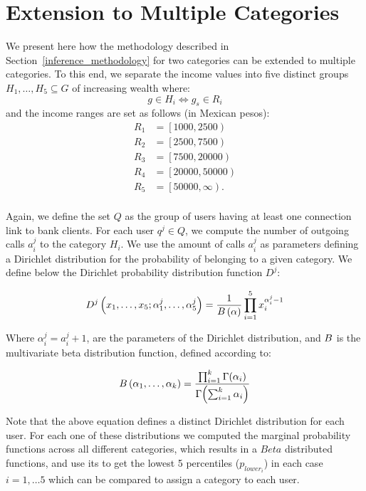 \section{Extension to Multiple Categories}

We present here how the methodology described in Section~\ref{inference_methodology} for
two categories can be extended to multiple categories.
To this end, we separate the income values into five distinct groups $ H_1, \ldots, H_5 \subseteq G$ of increasing wealth where:
\[
	g \in H_i \iff g_s \in R_i
\]
and the income ranges are set as follows (in Mexican pesos):
\begin{align*}
	R_1 &= \left[1000, 2500\right) \\
	R_2 &= \left[2500, 7500\right) \\
	R_3 &= \left[7500, 20000\right) \\
	R_4 &= \left[20000, 50000\right) \\
	R_5 &= \left[50000, \infty\right). \\
\end{align*}

Again, we define the set $Q$ as the group of users having at least one connection link to bank clients. For each user $q^j \in Q$, we compute the number of outgoing calls $a^j_i$ to the category $H_i$. 
We use the amount of calls $a^j_i$  as parameters defining a Dirichlet distribution for the probability of belonging to a given category. 
We define below the Dirichlet probability distribution function $D^j$:  

\begin{equation}
D^j \left( x_1, \ldots, x_5; \alpha^j_1, \ldots, \alpha^j_5 \right) = \frac{1}{B \left( \alpha \right)} \prod^5_{i = 1} x_i^{\alpha^j_i - 1}
\label{Dirichlet}
\end{equation}

Where $\alpha^j_i = a^j_i +1$, are the parameters of the Dirichlet distribution, and $B$ is the multivariate beta distribution function, defined according to: %

\begin{equation}
B \left( \alpha_1, \ldots, \alpha_k \right) = \frac{\prod^k_{i = 1} \Gamma \! \left( \alpha_i \right)}{\Gamma \! \left( \sum^k_{i = 1} \alpha_i \right) }
\label{Beta} 
\end{equation}

Note that the above equation defines a distinct Dirichlet distribution for each user. For each one of these distributions we computed the marginal probability functions across all different categories, which results in a $Beta$ distributed functions, and use its to get the  lowest 5 percentiles ($p_{lower_{i}}$) in each case ${i=1, \ldots 5}$ which can be compared to assign a category to each user. 


